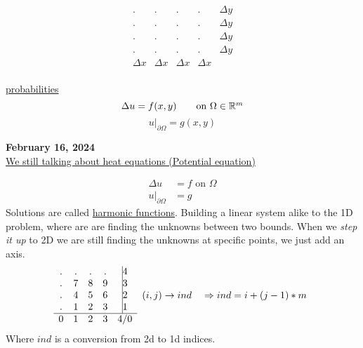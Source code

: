 \documentclass[10pt]{article}
\newcommand{\1}{\mathbb{1}}
\newcommand{\R}{\mathbb{R}}
\renewcommand{\part}{\partial}
\begin{document}
\[\begin{matrix}
   . &. &. &. & \Delta y\\
   . &. &. &. & \Delta y\\
   . &. &. &. & \Delta y\\
   . &. &. &. & \Delta y\\
    \Delta x & \Delta x & \Delta x & \Delta x\\
\end{matrix}
\]

\underline{probabilities}
\[\Delta u = f(x,y) \tag*{on $\Omega \in \R^m$}\]
\[u\big|_{\part \Omega} = g(x,y)\]


\textbf{February 16, 2024}\\

\underline{We still talking about heat equations (Potential equation)}

\begin{align*}
    \Delta u &= f \text{ on } \Omega\\
    u\big|_{\part \Omega} &= g \tag*{($\part$ is the boundary)}
\end{align*}
Solutions are called \underline{harmonic functions}. Building a linear system alike to the 1D problem, where are are finding the unknowns between two bounds. When we \textit{step it up} to 2D we are still finding the unknowns at specific points, we just add an axis.\\

\[\begin{matrix}
    . &. &. &. &\vline 4\\
    . &7 &8 &9 &\vline 3\\
    . &4 &5 &6 &\vline 2\\
    . &1 &2 &3 &\vline 1\\
   \hline
   0 & 1 & 2& 3 & 4/0\\
\end{matrix}
\quad (i,j) \to ind \quad \Rightarrow ind = i + (j-1)*m
\]
Where $ind$ is a conversion from 2d to 1d indices.\\
\end{document}
